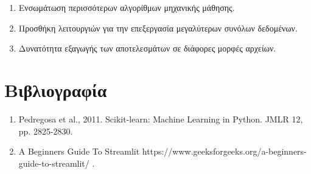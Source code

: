 \documentclass[a4paper,12pt]{article}
\begin{document}
\begin{enumerate}
\item Ενσωμάτωση περισσότερων αλγορίθμων μηχανικής μάθησης.
\item Προσθήκη λειτουργιών για την επεξεργασία μεγαλύτερων συνόλων δεδομένων.
\item Δυνατότητα εξαγωγής των αποτελεσμάτων σε διάφορες μορφές αρχείων.
\end{enumerate}

\section{Βιβλιογραφία}

\begin{enumerate}
    \item \textlatin{Pedregosa et al., 2011. Scikit-learn: Machine Learning in Python. JMLR 12, pp. 2825-2830}.
    \item \textlatin{A Beginners Guide To Streamlit https://www.geeksforgeeks.org/a-beginners-guide-to-streamlit/}
    .
\end{enumerate}
\end{document}
